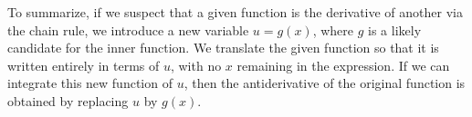 \documentclass{ximera}
\begin{document}
To summarize, if we suspect that a given function is the derivative of
another via the chain rule, we introduce a new variable $u=g(x)$, where $g$ is a likely candidate for
the inner function. We translate the given function so that it is
written entirely in terms of $u$, with no $x$ remaining in the
expression. If we can integrate this new function of $u$, then the
antiderivative of the original function is obtained by replacing $u$
by $g(x)$.
\end{document}
